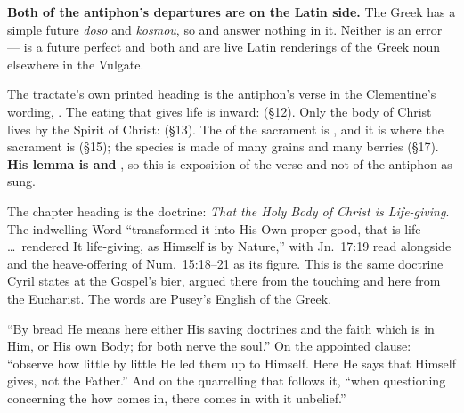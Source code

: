 \textbf{Both of the antiphon's departures are on the Latin side.} The Greek has a
simple future \emph{doso} and \emph{kosmou}, so  and 
answer nothing in it. Neither is an error ---  is a future
perfect and both  and  are live Latin renderings of
the Greek noun elsewhere in the Vulgate.

\begin{witnessnote}
 The tractate's own printed heading is the antiphon's verse in the
Clementine's wording, .
The eating that gives life is inward:  (§12). Only the body of Christ lives by
the Spirit of Christ:  (§13). The  of the sacrament is , and it is  where the sacrament is  (§15); the species is made of many grains and many berries
(§17). \textbf{His lemma is  and }, so this is
exposition of the verse and not of the antiphon as sung.
\end{witnessnote}

\begin{witnessnote}
 The
chapter heading is the doctrine: \emph{That the Holy Body of Christ is
Life-giving}. The indwelling Word ``transformed it into His Own proper good, that
is life \dots\ rendered It life-giving, as Himself is by Nature,'' with Jn.\ 17:19
read alongside and the heave-offering of Num.\ 15:18--21 as its figure. This is
the same doctrine Cyril states at the Gospel's bier, argued there from the
touching and here from the Eucharist. The words are Pusey's English of the
Greek.
\end{witnessnote}

\begin{witnessnote}
 ``By bread He means here either His
saving doctrines and the faith which is in Him, or His own Body; for both nerve
the soul.'' On the appointed clause: ``observe how little by little He led them up
to Himself. Here He says that Himself gives, not the Father.'' And on the
quarrelling that follows it, ``when questioning concerning the how comes in, there
comes in with it unbelief.''
\end{witnessnote}

